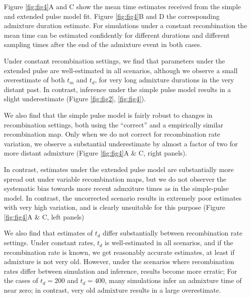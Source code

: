 \documentclass[]{article}
\begin{document}
Figure \ref{fig:fig4}A and C show the mean
time estimates received from the simple and extended pulse model fit. Figure \ref{fig:fig4}B and D the corresponding admixture duration estimate. For simulations under a
constant recombination the mean time can be estimated confidently for different durations and different sampling times after the end of the admixture event in both cases. 

Under constant recombination settings, we find that parameters under the extended pulse are well-estimated in all scenarios, although we observe a small overestimate of both $t_m$ and $t_d$, for very long admixture durations in the very distant past. In contrast, inference under the simple pulse model results in a slight underestimate (Figure \ref{fig:fig2}, \ref{fig:fig4}).

We also find that the simple pulse model is fairly robust to changes in recombination settings, both using the ``correct'' and a empirically similar recombination map. Only when we do not correct for recombination rate variation, we observe a substantial underestimate by almost a factor of two for more distant admixture (Figure \ref{fig:fig4}A \& C, right panels). 

In contrast, estimates under the extended pulse model are substantially more spread out under variable recombination maps, but we do not observer the systematic bias towards more recent admxiture times as in the simple-pulse model. In contrast, the uncorrected scenario results in extremely poor estimates with very high variation, and is clearly unsuitable for this purpose (Figure \ref{fig:fig4}A \& C, left panels)

We also find that estimates of $t_d$ differ substantially between recombination rate settings. Under constant rates, $t_d$ is well-estimated in all scenarios, and if the recombination rate is known, we get reasonably accurate estimates, at least if admixture is not very old. However, under the scenarios where recombination rates differ between simulation and inference, results become more erratic; For the cases of $t_d=200$ and $t_d=400$, many simulations infer an admixture time of near zero; in contrast, very old admixture results in a large overestimate.
\end{document}
